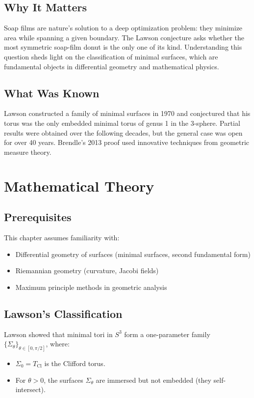 \subsection{Why It Matters}
Soap films are nature's solution to a deep optimization problem: they minimize area while spanning a given boundary. The Lawson conjecture asks whether the most symmetric soap-film donut is the only one of its kind. Understanding this question sheds light on the classification of minimal surfaces, which are fundamental objects in differential geometry and mathematical physics.

\subsection{What Was Known}
Lawson constructed a family of minimal surfaces in 1970 and conjectured that his torus was the only embedded minimal torus of genus 1 in the 3-sphere. Partial results were obtained over the following decades, but the general case was open for over 40 years. Brendle's 2013 proof used innovative techniques from geometric measure theory.

\section{Mathematical Theory}


\subsection{Prerequisites}
This chapter assumes familiarity with:
\begin{itemize}
\item Differential geometry of surfaces (minimal surfaces, second fundamental form)
\item Riemannian geometry (curvature, Jacobi fields)
\item Maximum principle methods in geometric analysis
\end{itemize}

\subsection{Lawson's Classification}
Lawson showed that minimal tori in $S^3$ form a one-parameter family $\{\Sigma_\theta\}_{\theta \in [0, \pi/2]}$, where:
\begin{itemize}
\item $\Sigma_0 = T_{\text{Cl}}$ is the Clifford torus.
\item For $\theta > 0$, the surfaces $\Sigma_\theta$ are immersed but not embedded (they self-intersect).
\end{itemize}

